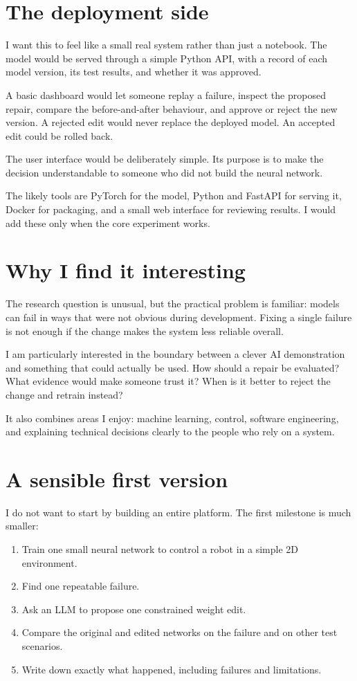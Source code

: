 \documentclass[11pt,a4paper]{article}
\begin{document}
\section*{The deployment side}
I want this to feel like a small real system rather than just a notebook. The model would be served through a simple Python API, with a record of each model version, its test results, and whether it was approved.

A basic dashboard would let someone replay a failure, inspect the proposed repair, compare the before-and-after behaviour, and approve or reject the new version. A rejected edit would never replace the deployed model. An accepted edit could be rolled back.

The user interface would be deliberately simple. Its purpose is to make the decision understandable to someone who did not build the neural network.

The likely tools are PyTorch for the model, Python and FastAPI for serving it, Docker for packaging, and a small web interface for reviewing results. I would add these only when the core experiment works.

\section*{Why I find it interesting}
The research question is unusual, but the practical problem is familiar: models can fail in ways that were not obvious during development. Fixing a single failure is not enough if the change makes the system less reliable overall.

I am particularly interested in the boundary between a clever AI demonstration and something that could actually be used. How should a repair be evaluated? What evidence would make someone trust it? When is it better to reject the change and retrain instead?

It also combines areas I enjoy: machine learning, control, software engineering, and explaining technical decisions clearly to the people who rely on a system.

\section*{A sensible first version}
I do not want to start by building an entire platform. The first milestone is much smaller:

\begin{enumerate}[leftmargin=*]
\item Train one small neural network to control a robot in a simple 2D environment.
\item Find one repeatable failure.
\item Ask an LLM to propose one constrained weight edit.
\item Compare the original and edited networks on the failure and on other test scenarios.
\item Write down exactly what happened, including failures and limitations.
\end{enumerate}
\end{document}
